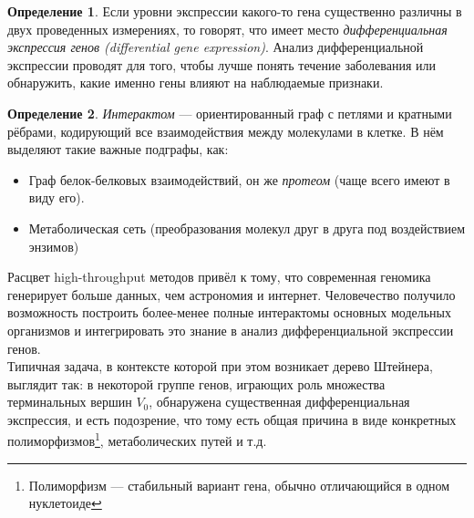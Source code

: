 \documentclass[11pt,a4paper]{report}
\theoremstyle{definition}
\theoremstyle{definition}
\theoremstyle{definition}
\newtheorem{definition}{Определение}[section]
\begin{document}
	\begin{definition}
		Если уровни экспрессии какого-то гена существенно различны в двух проведенных измерениях, то говорят, что имеет место \textit{дифференциальная экспрессия генов (differential gene expression)}. Анализ дифференциальной экспрессии проводят для того, чтобы лучше понять течение заболевания или обнаружить, какие именно гены влияют на наблюдаемые признаки.
	\end{definition}
	\begin{definition}
		\textit{Интерактом} — ориентированный граф с петлями и кратными рёбрами, кодирующий все взаимодействия между молекулами в клетке. В нём выделяют такие важные подграфы, как:
		\begin{itemize}
			\item Граф белок-белковых взаимодействий, он же \textit{протеом} (чаще всего имеют в виду его).
			\item Метаболическая сеть (преобразования молекул друг в друга под воздействием энзимов)
		\end{itemize}
	\end{definition}
	\noindent Расцвет high-throughput методов привёл к тому, что современная геномика генерирует больше данных, чем астрономия и интернет. Человечество получило возможность построить более-менее полные интерактомы основных модельных организмов и интегрировать это знание в анализ дифференциальной экспрессии генов.\\
	
	\noindent Типичная задача, в контексте которой при этом возникает дерево Штейнера, выглядит так: в некоторой группе генов, играющих роль множества терминальных вершин $V_0$, обнаружена существенная дифференциальная экспрессия, и есть подозрение, что тому есть общая причина в виде конкретных полиморфизмов\footnote{Полиморфизм — стабильный вариант гена, обычно отличающийся в одном нуклетоиде}, метаболических путей и т.д.\\
	
\end{document}

